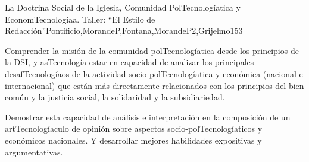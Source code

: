 \begin{syllabus}
\begin{unit}{La Doctrina Social de la Iglesia, Comunidad PolTecnologíatica y EconomTecnologíaa. Taller: ``El Estilo de Redacción''}{Pontificio,MorandeP,Fontana,MorandeP2,Grijelmo}{15}{3}
\begin{topics}
\end{topics}
\begin{unitgoals}
	\item Comprender la misión de la comunidad polTecnologíatica desde los principios de la DSI, y asTecnología estar en capacidad de analizar los principales desafTecnologíaos de la actividad socio-polTecnologíatica y económica (nacional e internacional) que están más directamente relacionados con los principios del bien común y la justicia social, la solidaridad y la subsidiariedad.
	\item Demostrar esta capacidad de análisis e interpretación en la composición de un artTecnologíaculo de opinión sobre aspectos socio-polTecnologíaticos y económicos nacionales. Y desarrollar mejores habilidades expositivas y argumentativas.
\end{unitgoals}
\end{unit}



\begin{coursebibliography}
\end{coursebibliography}
\end{syllabus}
